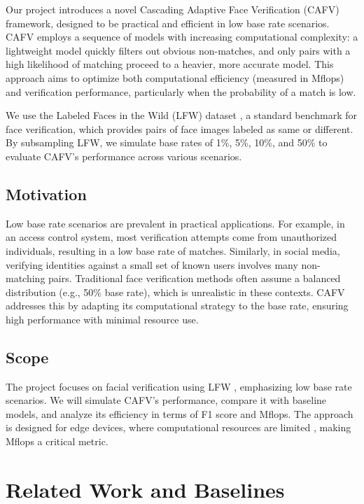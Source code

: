 \documentclass[times,10pt,twocolumn]{article}
\begin{document}
Our project introduces a novel Cascading Adaptive Face Verification (CAFV) framework, designed to be practical and efficient in low base rate scenarios. CAFV employs a sequence of models with increasing computational complexity: a lightweight model quickly filters out obvious non-matches, and only pairs with a high likelihood of matching proceed to a heavier, more accurate model. This approach aims to optimize both computational efficiency (measured in Mflops) and verification performance, particularly when the probability of a match is low.

We use the Labeled Faces in the Wild (LFW) dataset \cite{LFWdataset}, a standard benchmark for face verification, which provides pairs of face images labeled as same or different. By subsampling LFW, we simulate base rates of 1\%, 5\%, 10\%, and 50\% to evaluate CAFV's performance across various scenarios.

\subsection*{Motivation}
Low base rate scenarios are prevalent in practical applications. For example, in an access control system, most verification attempts come from unauthorized individuals, resulting in a low base rate of matches. Similarly, in social media, verifying identities against a small set of known users involves many non-matching pairs. Traditional face verification methods often assume a balanced distribution (e.g., 50\% base rate), which is unrealistic in these contexts. CAFV addresses this by adapting its computational strategy to the base rate, ensuring high performance with minimal resource use.

\subsection*{Scope}
The project focuses on facial verification using LFW \cite{LFWdataset}, emphasizing low base rate scenarios. We will simulate CAFV's performance, compare it with baseline models, and analyze its efficiency in terms of F1 score and Mflops. The approach is designed for edge devices, where computational resources are limited \cite{edgecomputing}, making Mflops a critical metric.

\section{Related Work and Baselines}
\end{document}
